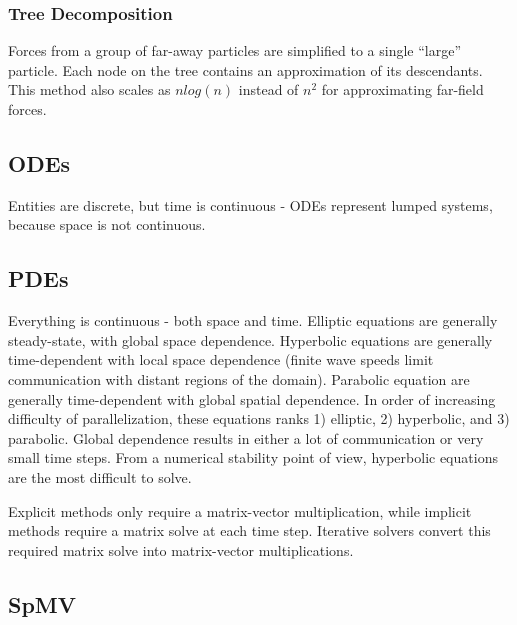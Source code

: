 \documentclass[10pt]{article}
\begin{document}
\begin{flushleft}
\subsubsection{Tree Decomposition}

Forces from a group of far-away particles are simplified to a single ``large'' particle. Each node on the tree contains an approximation of its descendants. This method also scales as \(nlog(n)\) instead of \(n^2\) for approximating far-field forces. 

\subsection{ODEs}

Entities are discrete, but time is continuous - ODEs represent lumped systems, because space is not continuous. 

\subsection{PDEs}

Everything is continuous - both space and time. Elliptic equations are generally steady-state, with global space dependence. Hyperbolic equations are generally time-dependent with local space dependence (finite wave speeds limit communication with distant regions of the domain). Parabolic equation are generally time-dependent with global spatial dependence. In order of increasing difficulty of parallelization, these equations ranks 1) elliptic, 2) hyperbolic, and 3) parabolic. Global dependence results in either a lot of communication or very small time steps. From a numerical stability point of view, hyperbolic equations are the most difficult to solve. 

Explicit methods only require a matrix-vector multiplication, while implicit methods require a matrix solve at each time step. Iterative solvers convert this required matrix solve into matrix-vector multiplications.

\subsection{SpMV}


\end{flushleft}
\end{document}
